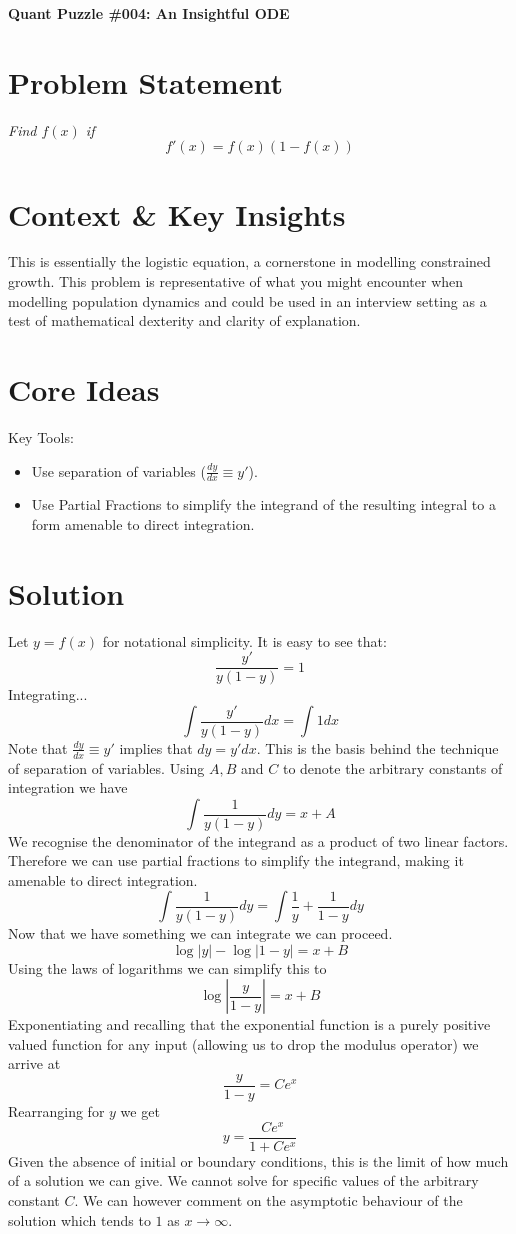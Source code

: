 \documentclass[12pt]{article}
\begin{document}
\begin{center}
    \Large \textbf{Quant Puzzle \#004: An Insightful ODE}
\end{center}

\section*{Problem Statement}
\textit{
Find $f(x)$ if \[f'(x)=f(x)\left(1-f(x)\right)\]
}

\bigskip

\section*{Context \& Key Insights}
This is essentially the logistic equation, a cornerstone in modelling constrained growth. This problem is representative of what you might encounter when modelling population dynamics and could be used in an interview setting as a test of mathematical dexterity and clarity of explanation.

\bigskip

\section*{Core Ideas}
Key Tools:
\begin{itemize}
    \item Use separation of variables ($\frac{dy}{dx}\equiv y'$).
    \item Use Partial Fractions to simplify the integrand of the resulting integral to a form amenable to direct integration.
\end{itemize}

\bigskip

\section*{Solution}
Let $y=f(x)$ for notational simplicity. It is easy to see that:
\[\frac{y'}{y(1-y)}=1\]
Integrating...
\[\int\frac{y'}{y(1-y)}dx = \int 1 dx\]
Note that $\frac{dy}{dx}\equiv y'$ implies that $dy = y' dx$. This is the basis behind the technique of separation of variables. Using $A, B$ and $C$ to denote the arbitrary constants of integration we have
\[\int\frac{1}{y(1-y)}dy = x + A\]
We recognise the denominator of the integrand as a product of two linear factors. Therefore we can use partial fractions to simplify the integrand, making it amenable to direct integration.
\[\int\frac{1}{y(1-y)}dy = \int\frac{1}{y}+\frac{1}{1-y}dy\]
Now that we have something we can integrate we can proceed.
\[\log|y| - \log|1-y| = x + B\]
Using the laws of logarithms we can simplify this to
\[\log\left|\frac{y}{1-y}\right| = x + B\]
Exponentiating and recalling that the exponential function is a purely positive valued function for any input (allowing us to drop the modulus operator) we arrive at
\[\frac{y}{1-y} = Ce^{x}\]
Rearranging for $y$ we get
\[y=\frac{Ce^x}{1+Ce^x}\]
Given the absence of initial or boundary conditions, this is the limit of how much of a solution we can give. We cannot solve for specific values of the arbitrary constant $C$. We can however comment on the asymptotic behaviour of the solution which tends to $1$ as $x\rightarrow{\infty}$.
\end{document}
